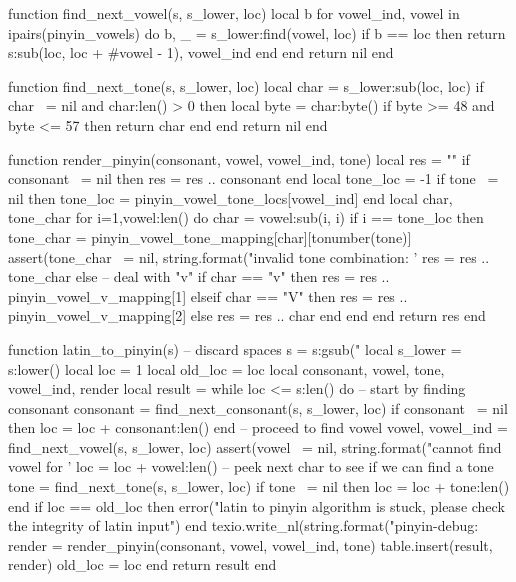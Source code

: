 \begin{luacode*}
function find_next_vowel(s, s_lower, loc)
    local b
    for vowel_ind, vowel in ipairs(pinyin_vowels) do
        b, _ = s_lower:find(vowel, loc)
        if b == loc then
            return s:sub(loc, loc + #vowel - 1), vowel_ind
        end
    end
    return nil
end

function find_next_tone(s, s_lower, loc)
    local char = s_lower:sub(loc, loc)
    if char ~= nil and char:len() > 0 then
        local byte = char:byte()
        if byte >= 48 and byte <= 57 then
            return char
        end
    end
    return nil
end

function render_pinyin(consonant, vowel, vowel_ind, tone)
    local res = ""
    if consonant ~= nil then
        res = res .. consonant
    end
    local tone_loc = -1
    if tone ~= nil then
         tone_loc = pinyin_vowel_tone_locs[vowel_ind]
    end
    local char, tone_char
    for i=1,vowel:len() do
        char = vowel:sub(i, i)
        if i == tone_loc then
            tone_char = pinyin_vowel_tone_mapping[char][tonumber(tone)]
            assert(tone_char ~= nil, string.format("invalid tone combination: '%
            res = res .. tone_char
        else
            -- deal with "v"
            if char == "v" then
                res = res .. pinyin_vowel_v_mapping[1]
            elseif char == "V" then
                res = res .. pinyin_vowel_v_mapping[2]
            else
                res = res .. char
            end
        end
    end
    return res
end

function latin_to_pinyin(s)
    -- discard spaces
    s = s:gsub("%
    local s_lower = s:lower()
    local loc = 1
    local old_loc = loc
    local consonant, vowel, tone, vowel_ind, render
    local result = {}
    while loc <= s:len() do
        -- start by finding consonant
        consonant = find_next_consonant(s, s_lower, loc)
        if consonant ~= nil then
            loc = loc + consonant:len()
        end
        -- proceed to find vowel
        vowel, vowel_ind = find_next_vowel(s, s_lower, loc)
        assert(vowel ~= nil, string.format("cannot find vowel for '%
        loc = loc + vowel:len()
        -- peek next char to see if we can find a tone
        tone = find_next_tone(s, s_lower, loc)
        if tone ~= nil then
            loc = loc + tone:len()
        end
        if loc == old_loc then
            error("latin to pinyin algorithm is stuck, please check the integrity of latin input")
        end
        texio.write_nl(string.format("pinyin-debug: %
        render = render_pinyin(consonant, vowel, vowel_ind, tone)
        table.insert(result, render)
        old_loc = loc
    end
    return result
end


\end{luacode*}

